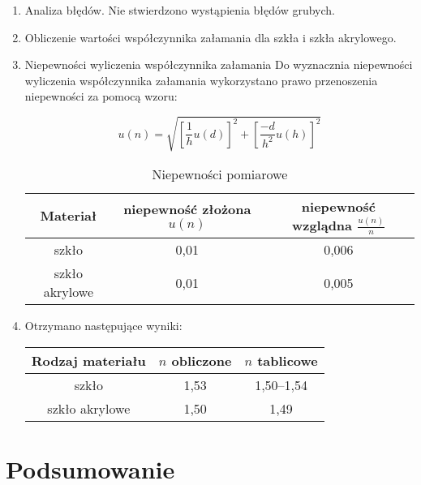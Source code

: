 \documentclass [a4paper,11pt]{article}
\begin{document}
\begin{enumerate}[label=\alph*)]
		\item Analiza błędów.
		Nie stwierdzono wystąpienia błędów grubych.
		
		\item Obliczenie wartości współczynnika załamania dla szkła i szkła akrylowego.
		
		\item Niepewności wyliczenia współczynnika załamania
		Do wyznacznia niepewności wyliczenia współczynnika załamania wykorzystano prawo przenoszenia niepewności za pomocą wzoru:
		
		\begin{equation}
		\label{eq:niepewnosczlozona}
		u(n) = \sqrt{\left[ \frac{1}{h}u(d) \right]^2 + \left[ \frac{-d}{h^2}u(h) \right]^2}
		\end{equation}
		\begin{table}[!h]
			\caption{Niepewności pomiarowe}
			\label{tab:niepewnosci}
			\begin{center}
				\begin{tabular}{|c|c|c|}
					\hline Materiał & niepewność złożona $u(n)$ & niepewność wzglądna $\frac{u(n)}{n}$ \\
					\hline szkło & 0,01 & 0,006 \\
					\hline szkło akrylowe & 0,01 & 0,005 \\
					\hline 
				\end{tabular} 
			\end{center}
		\end{table}
		
		
		\item Otrzymano następujące wyniki:
		\begin{center}
			\begin{tabular}{|c|c|c|}
				\hline Rodzaj materiału & $n$ obliczone & $n$ tablicowe \\
				\hline szkło & 1,53 & 1,50–1,54 \\
				\hline szkło akrylowe & 1,50 & 1,49 \\  
				\hline 
			\end{tabular} 
		\end{center}

	
	\end{enumerate}
	
	\section{Podsumowanie}
	\begin{center}
	
	\end{center}
\vspace{1em}
\end{document}
